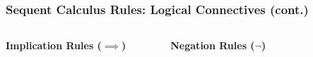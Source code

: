 \documentclass{beamer}
\begin{document}
      \begin{frame}
      \frametitle{Sequent Calculus Rules: Logical Connectives (cont.)}
      \begin{columns}
      
      \textbf{Implication Rules ($\implies$)}
      \begin{prooftree}
      \end{prooftree}
      
      \begin{prooftree}
      \end{prooftree}
      
      \textbf{Negation Rules ($\neg$)}
      \begin{prooftree}
      \end{prooftree}
      
      \begin{prooftree}
      \end{prooftree}
      
      \end{columns}
      \end{frame}
      
\end{document}
